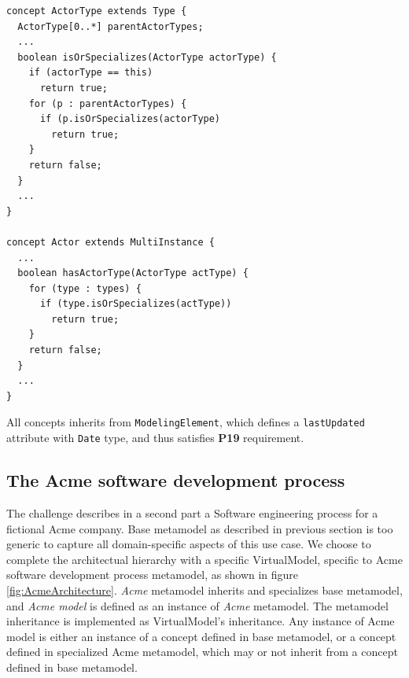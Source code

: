 \begin{lstlisting}
concept ActorType extends Type {
  ActorType[0..*] parentActorTypes;
  ...
  boolean isOrSpecializes(ActorType actorType) {    
    if (actorType == this)   
      return true;      
    for (p : parentActorTypes) {      
      if (p.isOrSpecializes(actorType)
        return true;
    }
    return false;
  }
  ...
}

concept Actor extends MultiInstance {
  ...
  boolean hasActorType(ActorType actType) {      
    for (type : types) {
      if (type.isOrSpecializes(actType))
        return true;
    }
    return false;
  }     
  ...
}
\end{lstlisting}

All concepts inherits from \texttt{ModelingElement}, which defines a \texttt{lastUpdated} attribute with \texttt{Date} type, and thus satisfies \textbf{P19} requirement. 

\subsection{The Acme software development process}
\label{sec:AcmeSoftwareDevelopmentProcess}

The challenge describes in a second part a Software engineering process for a fictional Acme company. Base metamodel as described in previous section is too generic to capture all domain-specific aspects of this use case. We choose to complete the architectual hierarchy with a specific VirtualModel, specific to Acme software development process metamodel, as shown in figure \ref{fig:AcmeArchitecture}. \textit{Acme} metamodel inherits and specializes base metamodel, and \textit{Acme model} is defined as an instance of \textit{Acme} metamodel. The metamodel inheritance is implemented as VirtualModel's inheritance. Any instance of Acme model is either an instance of a concept defined in base metamodel, or a concept defined in specialized Acme metamodel, which may or not inherit from a concept defined in base metamodel.

